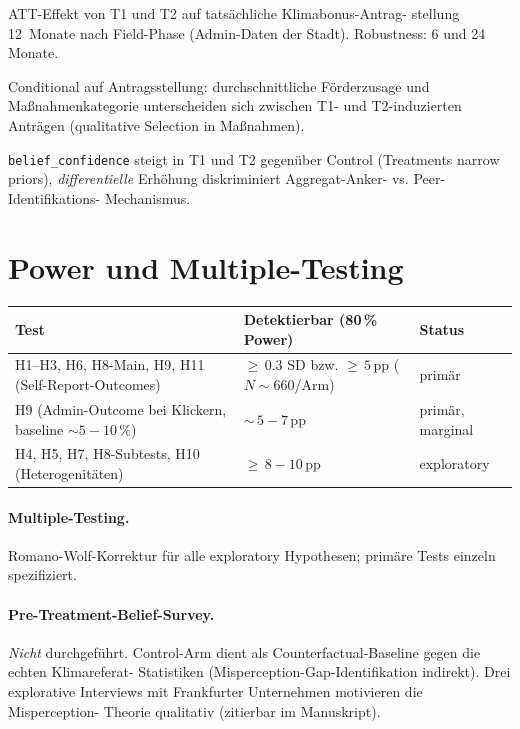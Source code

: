 \documentclass[11pt, a4paper]{scrartcl}
\newcommand{\var}[1]{\texttt{\small #1}}
\begin{document}
\begin{description}[font=\bfseries, leftmargin=1.4em, style=nextline]
    \item[H9 (Long-Run Application Effects), primär.]
        ATT-Effekt von T1 und T2 auf tatsächliche Klimabonus-Antrag-
        stellung 12~Monate nach Field-Phase (Admin-Daten der Stadt).
        Robustness: 6 und 24 Monate.

    \item[H10 (Application Quality), exploratory.]
        Conditional auf Antragsstellung: durchschnittliche Förderzusage
        und Maßnahmenkategorie unterscheiden sich zwischen T1- und
        T2-induzierten Anträgen (qualitative Selection in Maßnahmen).

    \item[H11 (Posterior Precision), primär.]
        \var{belief\_confidence} steigt in T1 und T2 gegenüber Control
        (Treatments narrow priors), \emph{differentielle} Erhöhung
        diskriminiert Aggregat-Anker- vs. Peer-Identifikations-
        Mechanismus.
\end{description}

\section{Power und Multiple-Testing}

\begin{tabularx}{\linewidth}{@{}lXl@{}}
\toprule
\textbf{Test} & \textbf{Detektierbar (80\,\% Power)} & \textbf{Status} \\
\midrule
H1--H3, H6, H8-Main, H9, H11 (Self-Report-Outcomes)
    & ${\geq}\,0.3$ SD bzw. ${\geq}\,5$\,pp ($N{\sim}660$/Arm)
    & primär \\
H9 (Admin-Outcome bei Klickern, baseline ${\sim}5{-}10\,\%$)
    & ${\sim}\,5{-}7$\,pp
    & primär, marginal \\
H4, H5, H7, H8-Subtests, H10 (Heterogenitäten)
    & ${\geq}\,8{-}10$\,pp
    & exploratory \\
\bottomrule
\end{tabularx}

\paragraph{Multiple-Testing.} Romano-Wolf-Korrektur für alle exploratory
Hypothesen; primäre Tests einzeln spezifiziert.

\paragraph{Pre-Treatment-Belief-Survey.} \emph{Nicht} durchgeführt.
Control-Arm dient als Counterfactual-Baseline gegen die echten Klimareferat-
Statistiken (Misperception-Gap-Identifikation indirekt). Drei explorative
Interviews mit Frankfurter Unternehmen motivieren die Misperception-
Theorie qualitativ (zitierbar im Manuskript).
\end{document}
